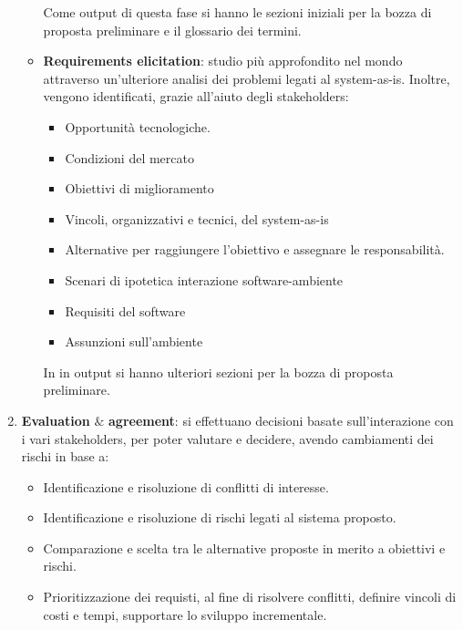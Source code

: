 \begin{enumerate}
\begin{itemize}
                    Come output di questa fase si hanno le sezioni iniziali per la bozza di
                    proposta preliminare e il glossario dei termini.
              \item \textbf{Requirements elicitation}: studio più approfondito nel mondo
                    attraverso un'ulteriore analisi dei problemi legati al system-as-is.
                    Inoltre, vengono identificati, grazie all'aiuto degli stakeholders:
                    \begin{itemize}
                        \item Opportunità tecnologiche.
                        \item Condizioni del mercato
                        \item Obiettivi di miglioramento
                        \item Vincoli, organizzativi e tecnici, del system-as-is
                        \item Alternative per raggiungere l'obiettivo e assegnare le responsabilità.
                        \item Scenari di ipotetica interazione software-ambiente
                        \item Requisiti del software
                        \item Assunzioni sull'ambiente
                    \end{itemize}
                    In in output si hanno ulteriori sezioni per la bozza di proposta preliminare.
          \end{itemize}
    \item \textbf{Evaluation} $\&$ \textbf{agreement}: si effettuano decisioni
          basate sull'interazione con i vari stakeholders, per poter valutare e decidere,
          avendo cambiamenti dei rischi in base a:
          \begin{itemize}
              \item Identificazione e risoluzione di conflitti di interesse.
              \item Identificazione e risoluzione di rischi legati al sistema proposto.
              \item Comparazione e scelta tra le alternative proposte in merito a
                    obiettivi e rischi.
              \item Prioritizzazione dei requisti, al fine di risolvere conflitti,
                    definire vincoli di costi e tempi, supportare lo sviluppo incrementale.
          \end{itemize}

\end{enumerate}

